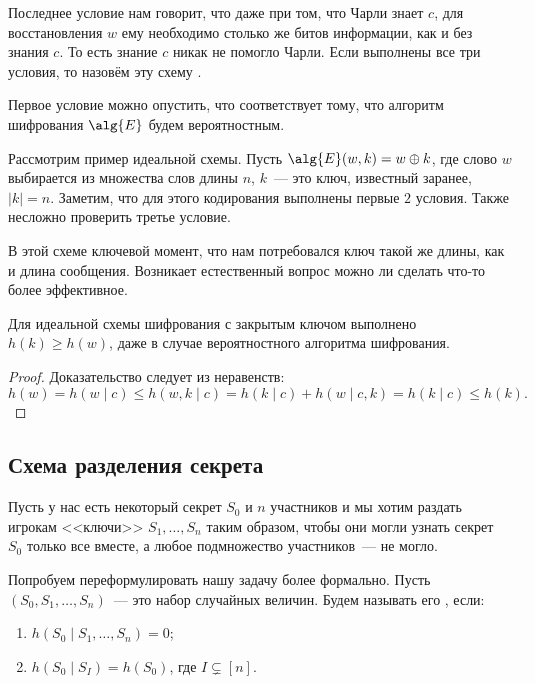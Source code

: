 Последнее условие нам говорит, что даже при том, что Чарли знает $c$, для восстановления $w$ ему
необходимо столько же битов информации, как и без знания $c$. То есть знание $c$ никак не помогло Чарли.
Если выполнены все три условия, то назовём эту схему .

\begin{remark}
    Первое условие можно опустить, что соответствует тому, что алгоритм шифрования $\alg{E}$ будем
    вероятностным.
\end{remark}

Рассмотрим пример идеальной схемы. Пусть $\alg{E}(w, k) = w \oplus k$, где слово $w$ выбирается из
множества слов длины $n$, $k$~--- это ключ, известный заранее, $|k| = n$. Заметим, что для этого
кодирования выполнены первые $2$ условия. Также несложно проверить третье условие.

В этой схеме ключевой момент, что нам потребовался ключ такой же длины, как и длина сообщения. Возникает
естественный вопрос можно ли сделать что-то более эффективное.

\begin{theorem}[Шеннон]
    Для идеальной схемы шифрования с закрытым ключом выполнено $h(k) \ge h(w)$, даже в случае
    вероятностного алгоритма шифрования.
\end{theorem}

\begin{proof}
    Доказательство следует из неравенств:
    $$
        h(w) = h(w \mid c) \le h(w, k \mid c) = h(k \mid c) + h(w \mid c,k) = h(k \mid c) \le h(k).
    $$
\end{proof}

\subsection{Схема разделения секрета}

Пусть у нас есть некоторый секрет $S_0$ и $n$ участников и мы хотим раздать игрокам <<ключи>> $S_1,
\dots, S_n$ таким образом, чтобы они могли узнать секрет $S_0$ только все вместе, а любое подмножество
участников~--- не могло.

Попробуем переформулировать нашу задачу более формально. Пусть $(S_0, S_1, \dots, S_n)$~--- это набор
случайных величин. Будем называть его , если: 
\begin{enumerate}
    \item $h(S_0 \mid S_1, \dots, S_n) = 0$;
    \item $h(S_0 \mid S_I) = h(S_0)$, где $I \subsetneq [n]$.
\end{enumerate}

